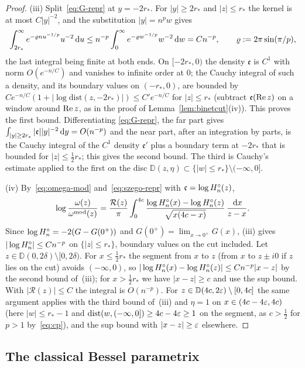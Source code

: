 \begin{proof}
(iii) Split~\eqref{eq:G-repr} at $y=-2r_*$. For $|y|\ge2r_*$ and $|z|\le r_*$ the kernel is at most $C|y|^{-2}$, and the
substitution $|y|=n^pw$ gives
\[
  \int_{2r_*}^\infty e^{-\varrho nu^{-1/p}}u^{-2}\,\mathrm{d} u\le n^{-p}\int_0^\infty e^{-\varrho w^{-1/p}}w^{-2}\,\mathrm{d} w=Cn^{-p},\qquad \varrho:=2\pi\sin(\pi/p),
\]
the last integral being finite at both ends. On $[-2r_*,0)$ the density $\mathfrak e$ is $C^1$ with norm $O(e^{-n/C})$ and
vanishes to infinite order at $0$; the Cauchy integral of such a density, and its boundary values on $(-r_*,0)$, are
bounded by $Ce^{-n/C}(1+|\log\mathrm{dist}(z,-2r_*)|)\le C'e^{-n/C}$ for $|z|\le r_*$ (subtract $\mathfrak e(\operatorname{Re} z)$ on a
window around $\operatorname{Re} z$, as in the proof of Lemma~\ref{lem:binetcut}(iv)). This proves the first bound. Differentiating
\eqref{eq:G-repr}, the far part gives $\int_{|y|\ge2r_*}|\mathfrak e||y|^{-2}\,\mathrm{d} y=O(n^{-p})$ and the near part, after an
integration by parts, is the Cauchy integral of the $C^1$ density $\mathfrak e'$ plus a boundary term at $-2r_*$ that is
bounded for $|z|\le\frac12r_*$; this gives the second bound. The third is Cauchy's estimate applied to the first on the
disc $\mathbb D(z,\eta)\subset\{|w|\le r_*\}\setminus(-\infty,0]$.

(iv) By~\eqref{eq:omega-mod} and~\eqref{eq:szego-repr} with $\mathfrak c=\log H^{\circ}_n(z)$,
\[
  \log\frac{\omega(z)}{\omega^{\mathrm{mod}}(z)}=\frac{\mathcal R(z)}\pi\int_0^{4c}\frac{\log H^{\circ}_n(x)-\log H^{\circ}_n(z)}{\sqrt{x(4c-x)}}\,\frac{\,\mathrm{d} x}{z-x}.
\]
Since $\log H^{\circ}_n=-2(G-G(0^+))$ and $G(0^+)=\lim_{x\to0^+}G(x)$, (iii) gives $|\log H^{\circ}_n|\le Cn^{-p}$ on $\{|z|\le r_*\}$, boundary
values on the cut included. Let $z\in \mathbb D(0,2\delta)\setminus[0,2\delta)$. For $x\le\frac12r_*$ the segment from $x$ to $z$
(from $x$ to $z\pm i0$ if $z$ lies on the cut) avoids $(-\infty,0)$, so $|\log H^{\circ}_n(x)-\log H^{\circ}_n(z)|\le Cn^{-p}|x-z|$ by the
second bound of~(iii); for $x>\frac12r_*$ we have $|x-z|\ge c$ and use the sup bound. With $|\mathcal R(z)|\le C$ the
integral is $O(n^{-p})$. For $z\in \mathbb D(4c,2\varepsilon)\setminus[0,4c]$ the same argument applies with the third bound of~(iii)
and $\eta=1$ on $x\in(4c-4\varepsilon,4c)$ (here $|w|\le r_*-1$ and $\mathrm{dist}(w,(-\infty,0])\ge4c-4\varepsilon\ge1$ on the segment,
as $c>\frac12$ for $p>1$ by~\eqref{eq:cp}), and the sup bound with $|x-z|\ge\varepsilon$ elsewhere.
\end{proof}

\subsection{The classical Bessel parametrix}\label{sec:classical-param}

